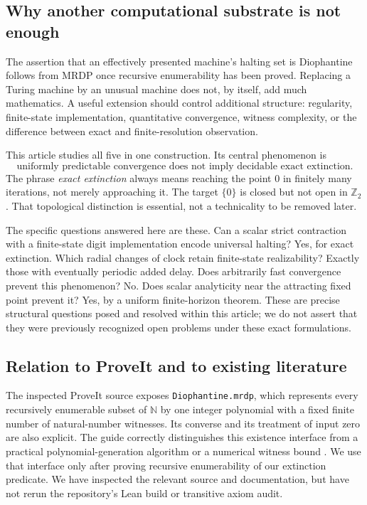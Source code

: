 \documentclass[11pt,letterpaper]{article}
\numberwithin{equation}{section}
\theoremstyle{definition}
\theoremstyle{remark}
\newcommand{\N}{\mathbb N}
\newcommand{\Ztwo}{\mathbb Z_2}
\begin{document}
\subsection{Why another computational substrate is not enough}
The assertion that an effectively presented machine's halting set is
Diophantine follows from MRDP once recursive enumerability has been proved.
Replacing a Turing machine by an unusual machine does not, by itself, add
much mathematics. A useful extension should control additional structure:
regularity, finite-state implementation, quantitative convergence, witness
complexity, or the difference between exact and finite-resolution
observation.

This article studies all five in one construction. Its central phenomenon is
\[
\boxed{\text{uniformly predictable convergence does not imply decidable exact extinction.}}
\]
The phrase \emph{exact extinction} always means reaching the point $0$ in
finitely many iterations, not merely approaching it. The target $\{0\}$ is
closed but not open in $\Ztwo$. That topological distinction is essential,
not a technicality to be removed later.

The specific questions answered here are these. Can a scalar strict
contraction with a finite-state digit implementation encode universal
halting? Yes, for exact extinction. Which radial changes of clock retain
finite-state realizability? Exactly those with eventually periodic added
delay. Does arbitrarily fast convergence prevent this phenomenon? No. Does
scalar analyticity near the attracting fixed point prevent it? Yes, by a
uniform finite-horizon theorem. These are precise structural questions posed
and resolved within this article; we do not assert that they were previously
recognized open problems under these exact formulations.

\subsection{Relation to ProveIt and to existing literature}
The inspected ProveIt source exposes
\texttt{Diophantine.mrdp}, which represents every recursively enumerable
subset of $\N$ by one integer polynomial with a fixed finite number of
natural-number witnesses. Its converse and its treatment of input zero are
also explicit. The guide correctly distinguishes this existence interface
from a practical polynomial-generation algorithm or a numerical witness
bound \cite{b62s12-proveit-mrdp,b62s12-proveit-source}. We use that interface only after
proving recursive enumerability of our extinction predicate. We have
inspected the relevant source and documentation, but have not rerun the
repository's Lean build or transitive axiom audit.
\end{document}
